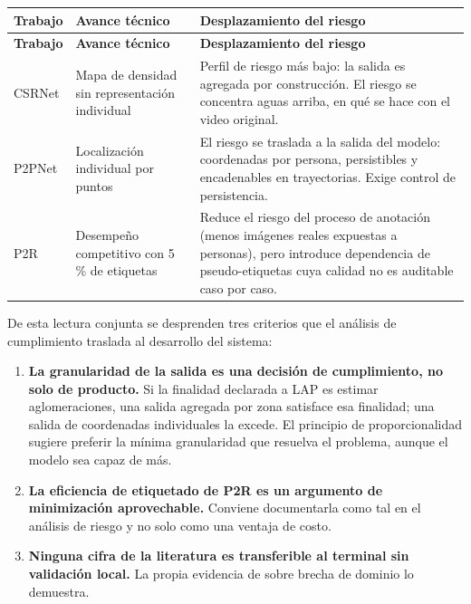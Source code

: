 {\small
\setlength{\LTleft}{0pt}\setlength{\LTright}{0pt}
\begin{longtable}{@{}L{2.5cm}L{3.0cm}L{\dimexpr\linewidth-5.5cm-4\tabcolsep\relax}@{}}
\toprule
\textbf{Trabajo} & \textbf{Avance técnico} & \textbf{Desplazamiento del riesgo} \\
\midrule
\endfirsthead
\toprule
\textbf{Trabajo} & \textbf{Avance técnico} & \textbf{Desplazamiento del riesgo} \\
\midrule
\endhead
\bottomrule
\endlastfoot
CSRNet \cite{Li_2018_CVPR} &
Mapa de densidad sin representación individual &
Perfil de riesgo más bajo: la salida es agregada por construcción. El
riesgo se concentra aguas arriba, en qué se hace con el video original. \\
\addlinespace
P2PNet \cite{Song_2021_ICCV} &
Localización individual por puntos &
El riesgo se traslada a la salida del modelo: coordenadas por persona,
persistibles y encadenables en trayectorias. Exige control de
persistencia. \\
\addlinespace
P2R \cite{Lin_2025_CVPR} &
Desempeño competitivo con 5\,\% de etiquetas &
Reduce el riesgo del proceso de anotación (menos imágenes reales
expuestas a personas), pero introduce dependencia de pseudo-etiquetas
cuya calidad no es auditable caso por caso. \\
\end{longtable}
}

De esta lectura conjunta se desprenden tres criterios que el análisis de cumplimiento traslada al desarrollo
del sistema:

\begin{enumerate}[leftmargin=1.6em,itemsep=0.35em]
  \item \textbf{La granularidad de la salida es una decisión de
        cumplimiento, no solo de producto.} Si la finalidad declarada a
        LAP es estimar aglomeraciones, una salida agregada por zona
        satisface esa finalidad; una salida de coordenadas individuales
        la excede. El principio de proporcionalidad sugiere preferir la
        mínima granularidad que resuelva el problema, aunque el modelo
        sea capaz de más.
  \item \textbf{La eficiencia de etiquetado de P2R es un argumento de
        minimización aprovechable.} Conviene documentarla como tal en el
        análisis de riesgo y no solo como una ventaja de costo.
  \item \textbf{Ninguna cifra de la literatura es transferible al
        terminal sin validación local.} La propia evidencia de
        \cite{Lin_2025_CVPR} sobre brecha de dominio lo demuestra.
\end{enumerate}


